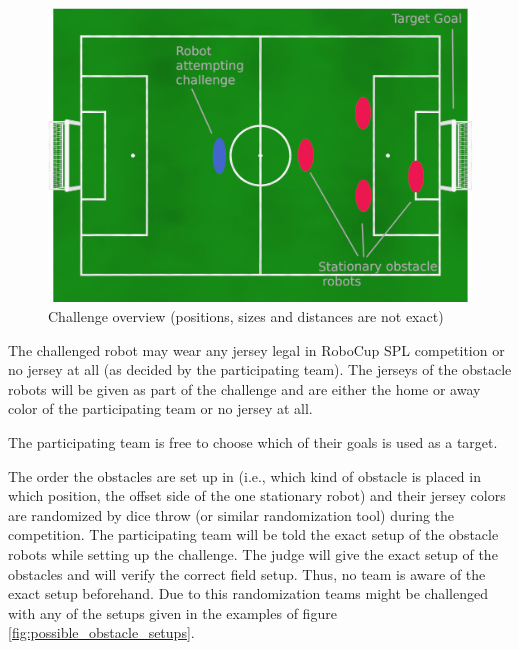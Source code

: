 \begin{figure}[ht]
	\centering
	\includegraphics[width=1.0\textwidth]{figs/obstacle_challenge_2021.jpeg}
	\caption{Challenge overview (positions, sizes and distances are not exact)}
\end{figure}

The challenged robot may wear any jersey legal in RoboCup SPL competition or no jersey at all (as decided by the participating team). The jerseys of the obstacle robots will be given as part of the challenge and are either the home or away color of the participating team or no jersey at all.

The participating team is free to choose which of their goals is used as a target.

The order the obstacles are set up in (i.e., which kind of obstacle is placed in which position, the offset side of the one stationary robot) and their jersey colors are randomized by dice throw (or similar randomization tool) during the competition. The participating team will be told the exact setup of the obstacle robots while setting up the challenge. The judge will give the exact setup of the obstacles and will verify the correct field setup. Thus, no team is aware of the exact setup beforehand. Due to this randomization teams might be challenged with any of the setups given in the examples of figure \ref{fig:possible_obstacle_setups}.

